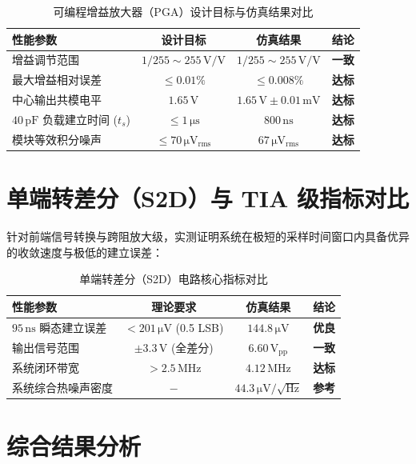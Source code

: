\begin{table}[H]
\centering
\caption{可编程增益放大器（PGA）设计目标与仿真结果对比}
\label{tab:compare_pga}
\begin{tabular}{lccc}
\toprule
\textbf{性能参数} & \textbf{设计目标} & \textbf{仿真结果} & \textbf{结论} \\
\midrule
增益调节范围 & $1/255 \sim 255\,\mathrm{V/V}$ & $1/255 \sim 255\,\mathrm{V/V}$ & \textbf{一致} \\
最大增益相对误差 & $\le 0.01\%$ & $\le 0.008\%$ & \textbf{达标} \\
中心输出共模电平 & $1.65\,\mathrm{V}$ & $1.65\,\mathrm{V} \pm 0.01\,\mathrm{mV}$ & \textbf{达标} \\
$40\,\mathrm{pF}$ 负载建立时间 ($t_s$) & $\le 1\,\mathrm{\mu s}$ & $800\,\mathrm{ns}$ & \textbf{达标} \\
模块等效积分噪声 & $\le 70\,\mathrm{\mu V_{rms}}$ & $67\,\mathrm{\mu V_{rms}}$ & \textbf{达标} \\
\bottomrule
\end{tabular}
\end{table}

\section{单端转差分（S2D）与 TIA 级指标对比}

针对前端信号转换与跨阻放大级，实测证明系统在极短的采样时间窗口内具备优异的收敛速度与极低的建立误差：

\begin{table}[H]
\centering
\caption{单端转差分（S2D）电路核心指标对比}
\label{tab:compare_s2d}
\begin{tabular}{lccc}
\toprule
\textbf{性能参数} & \textbf{理论要求} & \textbf{仿真结果} & \textbf{结论} \\
\midrule
$95\,\mathrm{ns}$ 瞬态建立误差 & $< 201\,\mathrm{\mu V}$ (0.5 LSB) & $144.8\,\mathrm{\mu V}$ & \textbf{优良} \\
输出信号范围 & $\pm 3.3\,\mathrm{V}$ (全差分) & $6.60\,\mathrm{V_{pp}}$ & \textbf{一致} \\
系统闭环带宽 & $> 2.5\,\mathrm{MHz}$ & $4.12\,\mathrm{MHz}$ & \textbf{达标} \\
系统综合热噪声密度 & $-$ & $44.3\,\mathrm{\mu V/\sqrt{Hz}}$ & \textbf{参考} \\
\bottomrule
\end{tabular}
\end{table}

\section{综合结果分析}

